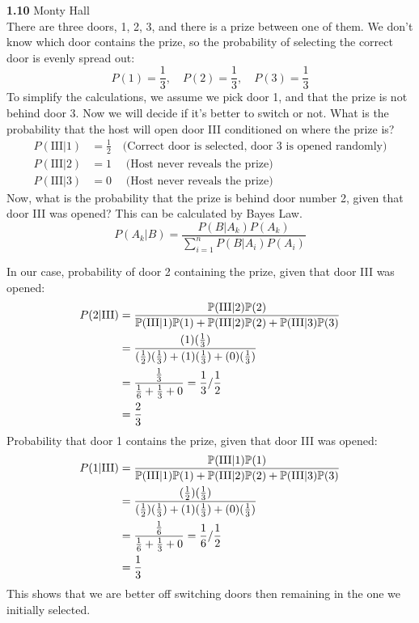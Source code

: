 \bigskip\noindent
\textbf{1.10} Monty Hall\\  %
There are three doors, 1, 2, 3, and there is a prize between one of them. We don't know which
door contains the prize, so the probability of selecting the correct door is evenly spread out:
$$
P(1) = \frac{1}{3},\quad
P(2) = \frac{1}{3},\quad
P(3) = \frac{1}{3}
$$
To simplify the calculations, we assume we pick door 1, and that the prize is not behind door 3.
Now we will decide if it's better to switch or not. What is the probability that the host will
open door III conditioned on where the prize is?
\begin{align*}
    P(\text{III}|1) &= \frac{1}{2} \quad\text{(Correct door is selected, door 3 is opened randomly)} \\
    P(\text{III}|2) &= 1 \quad\;\text{(Host never reveals the prize)}\\
    P(\text{III}|3) &= 0 \quad\;\text{(Host never reveals the prize)}
\end{align*}
Now, what is the probability that the prize is behind door number 2, given that door III was opened?
This can be calculated by Bayes Law.
$$
P(A_k|B) = \frac{P(B|A_k)P(A_k)}{\sum_{i=1}^n P(B|A_i)P(A_i)}
$$

\newpage\noindent
In our case, probability of door 2 containing the prize, given that door III was opened:
\begin{align*}
    P(2|\text{III}) &=
    \frac{\P(\text{III}|2)\P(2)}{\P(\text{III}|1)\P(1) + \P(\text{III}|2)\P(2) + \P(\text{III}|3)\P(3)} \\
    &= \frac{(1)(\frac{1}{3})}{(\frac{1}{2})(\frac{1}{3}) + (1)(\frac{1}{3}) + (0)(\frac{1}{3})} \\
    &= \frac{\frac{1}{3}}{\frac{1}{6} + \frac{1}{3} + 0} = \frac{1}{3} / \frac{1}{2} \\
    &= \frac{2}{3}
\end{align*}
Probability that door 1 contains the prize, given that door III was opened:
\begin{align*}
P(1|\text{III}) &=
\frac{\P(\text{III}|1)\P(1)}{\P(\text{III}|1)\P(1) + \P(\text{III}|2)\P(2) + \P(\text{III}|3)\P(3)} \\
&= \frac{(\frac{1}{2})(\frac{1}{3})}{(\frac{1}{2})(\frac{1}{3}) + (1)(\frac{1}{3}) + (0)(\frac{1}{3})} \\
&= \frac{\frac{1}{6}}{\frac{1}{6} + \frac{1}{3} + 0} = \frac{1}{6} / \frac{1}{2} \\
&= \frac{1}{3}
\end{align*}
This shows that we are better off switching doors then remaining in the one we initially selected.

